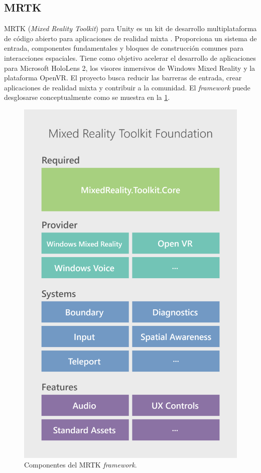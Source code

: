 
\subsection{MRTK}

MRTK (\textit{Mixed Reality Toolkit}) para Unity es un kit de desarrollo multiplataforma de código abierto para aplicaciones de realidad mixta \citep{MRTK}. Proporciona un sistema de entrada, componentes fundamentales y bloques de construcción comunes para interacciones espaciales. Tiene como objetivo acelerar el desarrollo de aplicaciones para Microsoft HoloLens 2, los visores inmersivos de Windows Mixed Reality y la plataforma OpenVR. El proyecto busca reducir las barreras de entrada, crear aplicaciones de realidad mixta y contribuir a la comunidad. El \textit{framework} puede desglosarse conceptualmente como se muestra en la \ref{fig:mrtk}.

\begin{figure}[htpb]
	\centering
	\includegraphics[scale=0.14]{./Figures/mrtk.png}
	\caption{Componentes del MRTK \textit{framework}\protect\footnotemark.}
	\label{fig:mrtk}
\end{figure}

